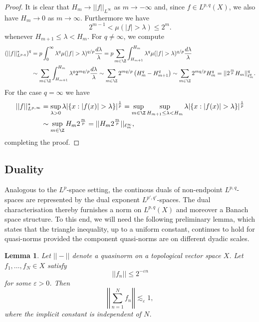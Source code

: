 \documentclass[reqno]{amsart}
\newtheorem{lemma}[theorem]{Lemma}
\theoremstyle{definition}
\theoremstyle{remark}
\renewcommand{\epsilon}{\varepsilon}
\begin{document}
\begin{proof}
	It is clear that $H_m \to ||f||_{L^\infty}$ as $m \to -\infty$ and, since $f \in L^{p, q} (X)$, we also have $H_m \to 0$ as $m \to \infty$. Furthermore we have
		\[ 2^{m - 1} < \mu( |f| > \lambda ) \leq 2^m. \] 
	whenever $H_{m + 1} \leq \lambda < H_m$. For $q \neq \infty$, we compute
			\begin{align*}
			\left( ||f||_{L^{p, q}}^* \right)^q
				&= p \int_0^\infty \lambda^q \mu(|f| > \lambda)^{q/p} \frac{d\lambda}{\lambda} = p \sum_{m \in \Z} \int_{H_{m + 1}}^{H_m}\lambda^q \mu(|f| > \lambda)^{q/p} \frac{d\lambda}{\lambda}   \\
				&\sim \sum_{m \in \Z} \int_{H_{m + 1}}^{H_m} \lambda^{q} 2^{mq/p} \frac{d\lambda}{\lambda} \sim \sum_{m \in \Z} 2^{mq/p} \left( H_m^q - H_{m+ 1}^q\right) \sim \sum_{m \in \Z} 2^{mq/p} H_m^q = ||2^{\frac{m}{p}} H_m ||_{\ell^q_m }^q.
		\end{align*}	
	For the case $q = \infty$ we have
		\begin{align*}
			||f||^*_{L^{p, \infty}} 
				&= \sup_{\lambda > 0} \lambda | \{ x : |f(x)| > \lambda \} |^\frac1p = \sup_{m \in \Z} \sup_{H_{m + 1} \leq \lambda < H_m} \lambda | \{ x : |f(x)| > \lambda \} |^\frac1p\\
				&\sim \sup_{m \in \Z} H_m 2^{\frac{m}{p}} = || H_m 2^{\frac{m}{p}} ||_{\ell^\infty_m },
		\end{align*}	
	completing the proof. 
\end{proof}




\subsection{Duality}

Analogous to the $L^p$-space setting, the continous duals of non-endpoint $L^{p, q}$-spaces are represented by the dual exponent $L^{p', q'}$-spaces. The dual characterisation thereby furnishes a norm on $L^{p, q} (X)$ and moreover a Banach space structure. To this end, we will need the following preliminary lemma, which states that the triangle inequality, up to a uniform constant, continues to hold for quasi-norms provided the component quasi-norms are on different dyadic scales. 

\begin{lemma}
	Let $|| - ||$ denote a quasinorm on a topological vector space $X$. Let $f_1, \dots, f_N \in X$ satisfy
		\[ ||f_n|| \leq 2^{-\epsilon n} \]
	for some $\epsilon > 0$. Then
		\[ \left| \left| \sum_{n = 1}^N f_n \right| \right| \lesssim_\epsilon 1, \]
	where the implicit constant is independent of $N$. 	\label{lem:quasinorm}
\end{lemma}
\end{document}
